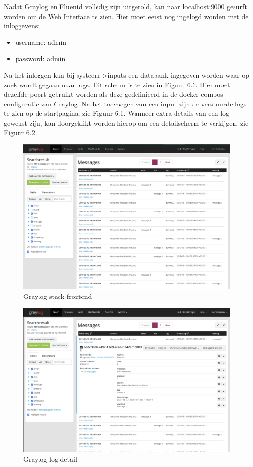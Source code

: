 Nadat Graylog en Fluentd volledig zijn uitgerold, kan naar localhost:9000 gesurft worden om de Web Interface te zien. Hier moet eerst nog ingelogd worden met de inloggevens: \begin{itemize}
   \item username: admin
   \item password: admin
\end{itemize}
Na het inloggen kan bij systeem->inputs een databank ingegeven worden waar op zoek wordt gegaan naar logs. Dit scherm is te zien in Figuur 6.3. Hier moet dezelfde poort gebruikt worden als deze gedefinieerd in de docker-compos configuratie van Graylog. Na het toevoegen van een input zijn de verstuurde logs te zien op de startpagina, zie Figuur 6.1. Wanneer extra details van een log gewenst zijn, kan doorgeklikt worden hierop om een detailscherm te verkijgen, zie Figuur 6.2.

\begin{figure}[ht]
    \centering
    \includegraphics[scale=0.35]{img/graylog_overview}
    \caption[Graylog stack frontend]{Graylog stack frontend}
\end{figure}

\begin{figure}[ht]
    \centering
    \includegraphics[scale=0.35]{img/graylog_detail}
    \caption[Graylog log detailscherm]{Graylog log detail}
\end{figure}

